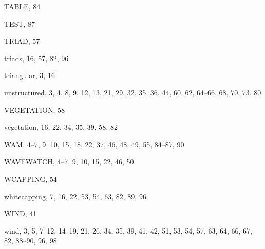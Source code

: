 \documentclass[12pt]{book}
\begin{document}
\begin{theindex}
  \indexspace

  \item TABLE, 84
  \item TEST, 87
  \item TRIAD, 57
  \item triads, 16, 57, 82, 96
  \item triangular, 3, 16

  \indexspace

  \item unstructured, 3, 4, 8, 9, 12, 13, 21, 29, 32, 35, 36, 44, 60,
		62, 64--66, 68, 70, 73, 80

  \indexspace

  \item VEGETATION, 58
  \item vegetation, 16, 22, 34, 35, 39, 58, 82

  \indexspace

  \item WAM, 4--7, 9, 10, 15, 18, 22, 37, 46, 48, 49, 55, 84--87, 90
  \item WAVEWATCH, 4--7, 9, 10, 15, 22, 46, 50
  \item WCAPPING, 54
  \item whitecapping, 7, 16, 22, 53, 54, 63, 82, 89, 96
  \item WIND, 41
  \item wind, 3, 5, 7--12, 14--19, 21, 26, 34, 35, 39, 41, 42, 51,
		53, 54, 57, 63, 64, 66, 67, 82, 88--90, 96, 98

\end{theindex}
\end{document}
